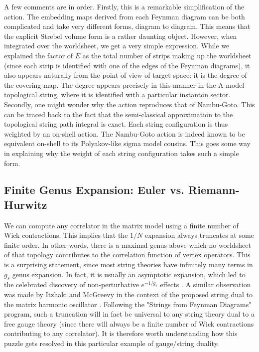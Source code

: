 \documentclass[english]{article}
\renewcommand{\>}{\rangle}
\newcommand{\<}{\langle}
\renewcommand{\(}{\left(}
\renewcommand{\)}{\right)}
\begin{document}
A few comments are in order. Firstly, this is a remarkable simplification of the action. The embedding maps derived from each Feynman diagram can be both complicated and take very different forms, diagram to diagram. This means that the explicit Strebel volume form is a rather daunting object. However, when integrated over the worldsheet, we get a very simple expression. While we explained the factor of $E$ as the total number of strips making up the worldsheet (since each strip is identified with one of the edges of the Feynman diagrams), it also appears naturally from the point of view of target space: it is the degree of the covering map. The degree appears precisely in this manner in the A-model topological string, where it is identified with a particular instanton sector. Secondly, one might wonder why the action reproduces that of Nambu-Goto. This can be traced back to the fact that the semi-classical approximation to the topological string path integral is exact. Each string configuration is thus weighted by an on-shell action. The Nambu-Goto action is indeed known to be equivalent on-shell to its Polyakov-like sigma model cousins. This goes some way in explaining why the weight of each string configuration takes such a simple form. 



\subsection{Finite Genus Expansion: Euler vs. Riemann-Hurwitz} \label{sec:finitegenusexp}

We can compute any correlator in the matrix model using a finite number of Wick contractions. This implies that the $1/N$ expansion always truncates at some finite order. In other words, there is a maximal genus above which no worldsheet of that topology contributes to the correlation function of vertex operators. This is a surprising statement, since most string theories have infinitely many terms in $g_{s}$ genus expansion. In fact, it is usually an asymptotic expansion, which led to the celebrated discovery of non-perturbative $e^{-1/g_{s}}$ effects \cite{cargeseSteve}. A similar observation was made by Itzhaki and McGreevy in the context of the proposed string dual to the matrix harmonic oscillator \cite{McGreevy_2004}. Following the "Strings from Feynman Diagrams" program, such a truncation will in fact be universal to any string theory dual to a free gauge theory (since there will always be a finite number of Wick contractions contributing to any correlator). It is therefore worth understanding how this puzzle gets resolved in this particular example of gauge/string duality.
\end{document}

